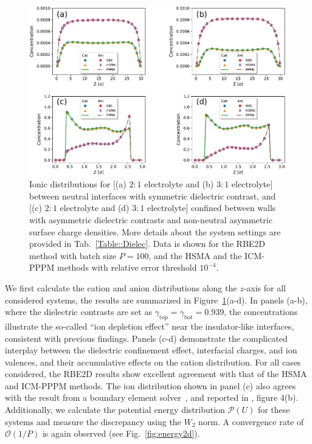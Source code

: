 \begin{figure}[ht!]
\centering
	\includegraphics[width=0.95\linewidth]{figs/DistributionDie.pdf}
	\caption{Ionic distributions for [(a) $2:1$ electrolyte and (b) $3:1$ electrolyte] between neutral interfaces with symmetric dielectric contrast, and [(c) $2:1$ electrolyte and (d) $3:1$ electrolyte] confined between walls with asymmetric dielectric contrasts and non-neutral asymmetric surface charge densities. More details about the system settings are provided in Tab.~\ref{Table::Dielec}. 
    Data   {is} shown for the RBE2D method with batch size $P=100$, and the HSMA and the ICM-PPPM methods with relative error threshold $10^{-4}$.} 
	\label{fig:den1}
\end{figure}

We first calculate the cation and anion distributions along  {the} $z$-axis for all considered systems, the results are summarized in Figure~\ref{fig:den1}(a-d). 
In panels (a-b), where the dielectric contrasts are set as $\gamma_{\text{top}}=\gamma_{\text{bot}}=0.939$, the concentrations illustrate the so-called ``ion depletion effect'' near the insulator-like interfaces, consistent with previous findings. 
Panels (c-d) demonstrate the complicated interplay between the dielectric confinement effect, interfacial charges, and ion valences, and their accumulative effects on the cation distribution. %
For all cases considered, the RBE2D results show excellent agreement with that of the HSMA and ICM-PPPM methods. 
The ion distribution shown in panel (c) also agrees with the result from a boundary element solver~\cite{wu2018asymmetric}, and reported in \cite{yuan2021particle}, figure 4(b). 
Additionally, we calculate the potential energy distribution $\mathscr{P}(U)$ for these systems and measure the discrepancy using the $W_2$ norm.
A convergence rate of $\mathcal{O}(1/P)$ is again observed (see Fig.~\ref{fig:energy2d}).

